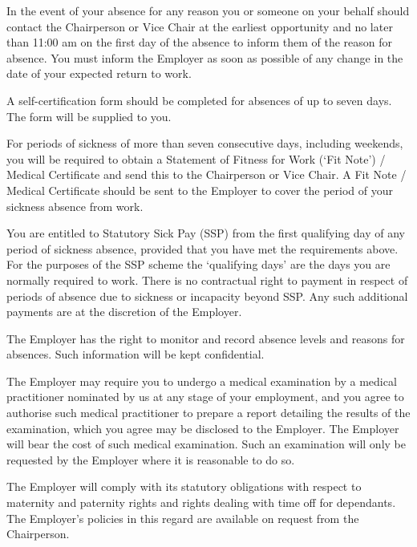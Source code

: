 \documentclass[a4paper,11pt,onecolumn ]{article}
\begin{document}
\begin{legal}
\begin{legal}
\item In the event of your absence for any reason you or someone on your behalf
should contact the Chairperson or Vice Chair at the earliest opportunity and no
later than 11:00 am on the first day of the absence to inform them of the reason
for absence. You must inform the Employer as soon as possible of any change in
the date of your expected return to work.
\item A self-certification form should be completed for absences of up to seven days.
The form will be supplied to you.
\item For periods of sickness of more than seven consecutive days, including
weekends, you will be required to obtain a Statement of Fitness for Work (‘Fit
Note’) / Medical Certificate and send this to the Chairperson or Vice Chair. A Fit
Note / Medical Certificate should be sent to the Employer to cover the period of
your sickness absence from work.
\item You are entitled to Statutory Sick Pay (SSP) from the first qualifying day of any
period of sickness absence, provided that you have met the requirements above. For the
purposes of the SSP scheme the ‘qualifying days’ are the days you are normally required
to work. There is no contractual right to payment in respect of periods of absence due
to sickness or incapacity beyond SSP. Any such additional payments are at the
discretion of the Employer.
\item The Employer has the right to monitor and record absence levels and reasons
for absences. Such information will be kept confidential.
\item The Employer may require you to undergo a medical examination by a medical
practitioner nominated by us at any stage of your employment, and you agree to
authorise such medical practitioner to prepare a report detailing the results of
the examination, which you agree may be disclosed to the Employer. The
Employer will bear the cost of such medical examination. Such an examination
will only be requested by the Employer where it is reasonable to do so.
\end{legal}

\item {}
The Employer will comply with its statutory obligations with respect to maternity
and paternity rights and rights dealing with time off for dependants. The Employer’s
policies in this regard are available on request from the Chairperson.


\end{legal}
\end{document}
